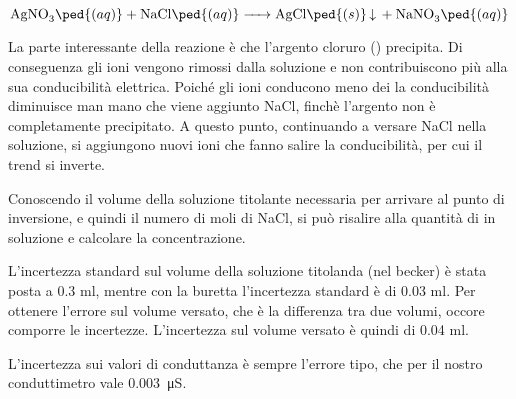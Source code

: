 \begin{equation*}
        \ce{AgNO3\ped{(aq)} + NaCl\ped{(aq)} -> AgCl\ped{(s)} v + NaNO3\ped{(aq)}}
\end{equation*}

La parte interessante della reazione è che l'argento cloruro () precipita. Di conseguenza gli ioni 
vengono rimossi dalla soluzione e non contribuiscono più alla sua conducibilità elettrica.
Poiché gli ioni  conducono meno dei  la conducibilità diminuisce man mano che viene aggiunto NaCl,
finchè l'argento non è completamente precipitato. A questo punto, continuando a versare NaCl nella soluzione, si aggiungono nuovi ioni  che fanno salire la conducibilità,
per cui il trend si inverte.

Conoscendo il volume della soluzione titolante necessaria per arrivare al punto di inversione, e quindi il numero di moli
di NaCl, si può risalire alla quantità di  in soluzione e calcolare la concentrazione.

L'incertezza standard sul volume della soluzione titolanda (nel becker) è stata posta a 0.3 ml, mentre con la
buretta l'incertezza standard è di 0.03 ml. Per ottenere l'errore sul volume versato, che è la differenza tra due volumi,
occore comporre le incertezze. L'incertezza sul volume versato è quindi di 0.04 ml.

L'incertezza sui valori di conduttanza è sempre l'errore tipo, che per il nostro conduttimetro vale \SI{0.003}{\micro\siemens}.
